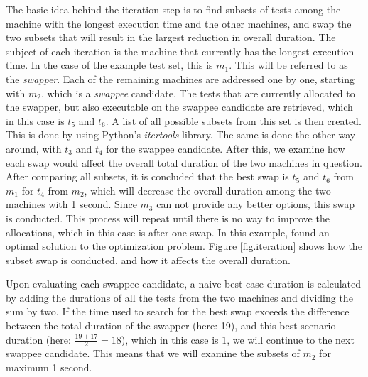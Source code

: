 The basic idea behind the iteration step is to find subsets of tests among the machine with the longest execution time and the other machines, and swap the two subsets that will result in the largest reduction in overall duration. The subject of each iteration is the machine that currently has the longest execution time. In the case of the example test set, this is $m_{1}$. This will be referred to as the \emph{swapper}. Each of the remaining machines are addressed one by one, starting with $m_{2}$, which is a \emph{swappee} candidate. The tests that are currently allocated to the swapper, but also executable on the swappee candidate are retrieved, which in this case is $t_{5}$ and $t_{6}$. A list of all possible subsets from this set is then created. This is done by using Python's \emph{itertools} library. The same is done the other way around, with $t_{3}$ and $t_{4}$ for the swappee candidate. After this, we examine how each swap would affect the overall total duration of the two machines in question. After comparing all subsets, it is concluded that the best swap is $t_{5}$ and $t_{6}$ from $m_{1}$ for $t_{4}$ from $m_{2}$, which will decrease the overall duration among the two machines with 1 second. Since $m_{3}$ can not provide any better options, this swap is conducted. This process will repeat until there is no way to improve the allocations, which in this case is after one swap. In this example, \toolname \space found an optimal solution to the optimization problem. Figure \ref{fig.iteration} shows how the subset swap is conducted, and how it affects the overall duration.

Upon evaluating each swappee candidate, a naive best-case duration is calculated by adding the durations of all the tests from the two machines and dividing the sum by two. If the time used to search for the best swap exceeds the difference between the total duration of the swapper (here: 19), and this best scenario duration (here: $\frac{19+17}{2} = 18$), which in this case is $1$, we will continue to the next swappee candidate. This means that we will examine the subsets of $m_{2}$ for maximum 1 second.


